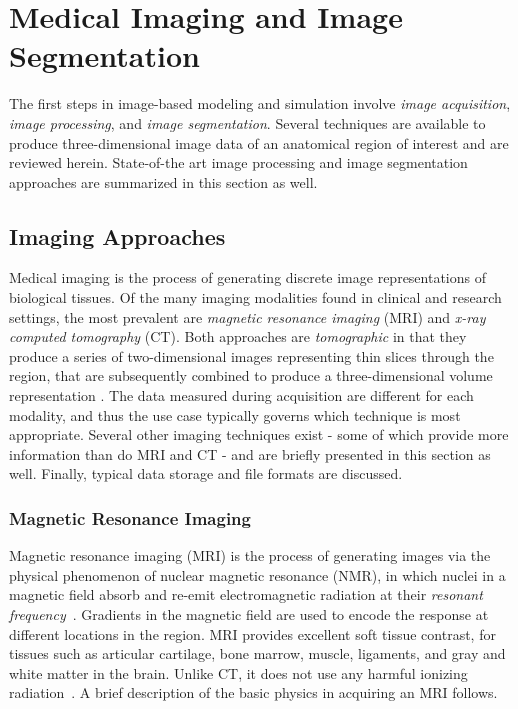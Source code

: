 \chapter{Medical Imaging and Image Segmentation}
%

The first steps in image-based modeling and simulation involve \textit{image acquisition}, \textit{image processing}, and \textit{image segmentation}. Several techniques are available to produce three-dimensional image data of an anatomical region of interest and are reviewed herein. State-of-the art image processing and image segmentation approaches are summarized in this section as well.

\section{Imaging Approaches}
\label{Imaging Approaches}

Medical imaging is the process of generating discrete image representations of biological tissues. Of the many imaging modalities found in clinical and research settings, the most prevalent are \textit{magnetic resonance imaging} (MRI) and \textit{x-ray computed tomography} (CT). Both approaches are \textit{tomographic} in that they produce a series of two-dimensional images representing thin slices through the region, that are subsequently combined to produce a three-dimensional volume representation \cite{larobina_murino_2014}. The data measured during acquisition are different for each modality, and thus the use case typically governs which technique is most appropriate. Several other imaging techniques exist - some of which provide more information than do MRI and CT - and are briefly presented in this section as well. Finally, typical data storage and file formats are discussed.

\subsection{Magnetic Resonance Imaging}
\label{Magnetic Resonance Imaging}

Magnetic resonance imaging (MRI) is the process of generating images via the physical phenomenon of nuclear magnetic resonance (NMR), in which nuclei in a magnetic field absorb and re-emit electromagnetic radiation at their \textit{resonant frequency}~\cite{NMR}. Gradients in the magnetic field are used to encode the response at different locations in the region. MRI provides excellent soft tissue contrast, for tissues such as articular cartilage, bone marrow, muscle, ligaments, and gray and white matter in the brain. Unlike CT, it does not use any harmful ionizing radiation~\cite{waldman_campbell}. A brief description of the basic physics in acquiring an MRI follows.


